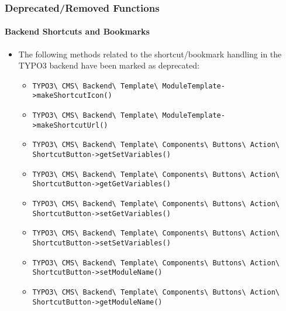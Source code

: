 %

\begin{frame}[fragile]
	\frametitle{Deprecated/Removed Functions}
	\framesubtitle{Backend Shortcuts and Bookmarks}

	\begin{itemize}
		\item The following methods related to the shortcut/bookmark handling in
			the TYPO3 backend have been marked as deprecated:
			\vspace{0.2cm}
			\begin{itemize}\tiny
				\item \texttt{TYPO3\textbackslash
					CMS\textbackslash
					Backend\textbackslash
					Template\textbackslash
					ModuleTemplate->makeShortcutIcon()}
				\item \texttt{TYPO3\textbackslash
					CMS\textbackslash
					Backend\textbackslash
					Template\textbackslash
					ModuleTemplate->makeShortcutUrl()}
				\item \texttt{TYPO3\textbackslash
					CMS\textbackslash
					Backend\textbackslash
					Template\textbackslash
					Components\textbackslash
					Buttons\textbackslash
					Action\textbackslash
					ShortcutButton->getSetVariables()}
				\item \texttt{TYPO3\textbackslash
					CMS\textbackslash
					Backend\textbackslash
					Template\textbackslash
					Components\textbackslash
					Buttons\textbackslash
					Action\textbackslash
					ShortcutButton->getGetVariables()}
				\item \texttt{TYPO3\textbackslash
					CMS\textbackslash
					Backend\textbackslash
					Template\textbackslash
					Components\textbackslash
					Buttons\textbackslash
					Action\textbackslash
					ShortcutButton->setGetVariables()}
				\item \texttt{TYPO3\textbackslash
					CMS\textbackslash
					Backend\textbackslash
					Template\textbackslash
					Components\textbackslash
					Buttons\textbackslash
					Action\textbackslash
					ShortcutButton->setSetVariables()}
				\item \texttt{TYPO3\textbackslash
					CMS\textbackslash
					Backend\textbackslash
					Template\textbackslash
					Components\textbackslash
					Buttons\textbackslash
					Action\textbackslash
					ShortcutButton->setModuleName()}
				\item \texttt{TYPO3\textbackslash
					CMS\textbackslash
					Backend\textbackslash
					Template\textbackslash
					Components\textbackslash
					Buttons\textbackslash
					Action\textbackslash
					ShortcutButton->getModuleName()}
			\end{itemize}\normalsize


\end{itemize}
\end{frame}
